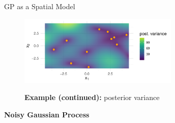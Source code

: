 \begin{frame}[c,allowframebreaks]{GP as a Spatial Model}
\begin{figure}\includegraphics[width=0.68\textwidth]{figure/mbo-2d-2-1.pdf}\par
\vspace{-3mm}
\begin{footnotesize}
\textbf{Example (continued):} posterior variance
\end{footnotesize}
\end{figure}


\end{frame}
\begin{frame}[c]{}
\centering
\huge
\textbf{Noisy Gaussian Process}
\end{frame}
